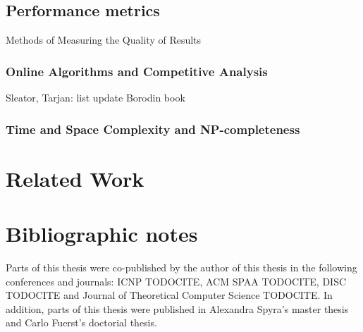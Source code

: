 

\subsection{Performance metrics}

Methods of Measuring the Quality of Results

\subsubsection{Online Algorithms and Competitive Analysis}

Sleator, Tarjan: list update \cite{competitive-analysis}
Borodin book \cite{borodin-book}

\subsubsection{Time and Space Complexity and NP-completeness}


\section{Related Work}





\section{Bibliographic notes}

Parts of this thesis were co-published by the author of this thesis in the following conferences and journals: ICNP TODOCITE, ACM SPAA TODOCITE, DISC TODOCITE and Journal of Theoretical Computer Science TODOCITE.
In addition, parts of this thesis were published in Alexandra Spyra's master thesis and Carlo Fuerst's doctorial thesis.